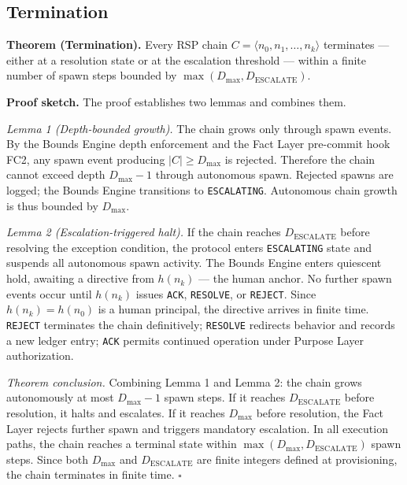 \subsection{Termination}
\label{sec:rs-termination}

\medskip
\noindent\textbf{Theorem (Termination).} Every RSP chain $C = \langle n_0, n_1, \ldots, n_k \rangle$ terminates — either at a resolution state or at the escalation threshold — within a finite number of spawn steps bounded by $\max(D_{\mathrm{max}}, D_{\mathrm{ESCALATE}})$.

\medskip
\noindent\textbf{Proof sketch.} The proof establishes two lemmas and combines them.

\medskip
\textit{Lemma 1 (Depth-bounded growth).} The chain grows only through spawn events. By the Bounds Engine depth enforcement and the Fact Layer pre-commit hook FC2, any spawn event producing $|C| \geq D_{\mathrm{max}}$ is rejected. Therefore the chain cannot exceed depth $D_{\mathrm{max}} - 1$ through autonomous spawn. Rejected spawns are logged; the Bounds Engine transitions to \texttt{ESCALATING}. Autonomous chain growth is thus bounded by $D_{\mathrm{max}}$.

\medskip
\textit{Lemma 2 (Escalation-triggered halt).} If the chain reaches $D_{\mathrm{ESCALATE}}$ before resolving the exception condition, the protocol enters \texttt{ESCALATING} state and suspends all autonomous spawn activity. The Bounds Engine enters quiescent hold, awaiting a directive from $h(n_k)$ — the human anchor. No further spawn events occur until $h(n_k)$ issues \texttt{ACK}, \texttt{RESOLVE}, or \texttt{REJECT}. Since $h(n_k) = h(n_0)$ is a human principal, the directive arrives in finite time. \texttt{REJECT} terminates the chain definitively; \texttt{RESOLVE} redirects behavior and records a new ledger entry; \texttt{ACK} permits continued operation under Purpose Layer authorization.

\medskip
\textit{Theorem conclusion.} Combining Lemma 1 and Lemma 2: the chain grows autonomously at most $D_{\mathrm{max}} - 1$ spawn steps. If it reaches $D_{\mathrm{ESCALATE}}$ before resolution, it halts and escalates. If it reaches $D_{\mathrm{max}}$ before resolution, the Fact Layer rejects further spawn and triggers mandatory escalation. In all execution paths, the chain reaches a terminal state within $\max(D_{\mathrm{max}}, D_{\mathrm{ESCALATE}})$ spawn steps. Since both $D_{\mathrm{max}}$ and $D_{\mathrm{ESCALATE}}$ are finite integers defined at provisioning, the chain terminates in finite time. $\square$

